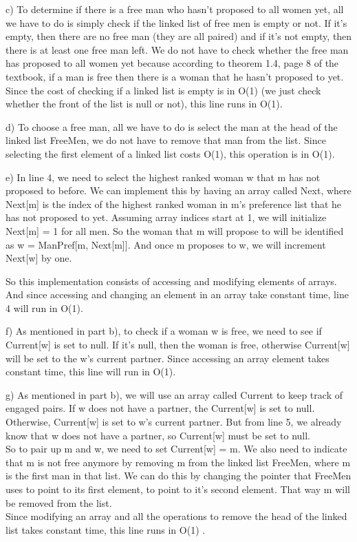 \documentclass{article}
\begin{document}
 


c) To determine if there is a free man who hasn't proposed to all women yet, all we have to do is simply check if the linked list of free men is empty or not. If it's empty, then there are no free man (they are all paired) and if it's not empty, then there is at least one free man left. We do not have to check whether the free man has proposed to all women yet because according to theorem 1.4, page 8 of the textbook, if a man is free then there is a woman that he hasn't proposed to yet. Since the cost of checking if a linked list is empty is in O(1) (we just check whether the front of the list is null or not), this line runs in O(1).

d) 
To choose a free man, all we have to do is select the man at the head of the linked list FreeMen, we do not have to remove that man from the list. Since selecting the first element of a linked list costs O(1), this operation is in O(1).


e) In line 4, we need to select the highest ranked woman w that m has not proposed to before. We can implement this by having an array called Next, where Next[m] is the index of the highest ranked woman in m's preference list that he has not proposed to yet. Assuming array indices start at 1, we will initialize Next[m] = 1 for all men. So the woman that m will propose to will be identified as w = ManPref[m, Next[m]]. And once m proposes to w, we will increment Next[w] by one.

So this implementation consists of accessing and modifying elements of arrays. And since accessing and changing an element in an array take constant time, line 4 will run in O(1).

f) As mentioned in part b), to check if a woman w is free, we need to see if Current[w] is set to null. If it's null, then the woman is free, otherwise Current[w] will be set to the w's current partner. Since accessing an array element takes constant time, this line will run in O(1).

g) As mentioned in part b), we will use an array called Current to keep track of engaged pairs. If w does not have a partner, the Current[w] is set to null. Otherwise, Current[w] is set to w's current partner. But from line 5, we already know that w does not have a partner, so Current[w] must be set to null. \\
So to pair up m and w, we need to set Current[w] = m.
We also need to indicate that m is not free anymore by removing m from the linked list FreeMen, where m is the first man in that list. We can do this by changing the pointer that FreeMen uses to point to its first element, to point to it's second element. That way m will be removed from the list.\\
Since modifying an array and all the operations to remove the head of the linked list takes constant time, this line runs in O(1) .
 
\end{document}
